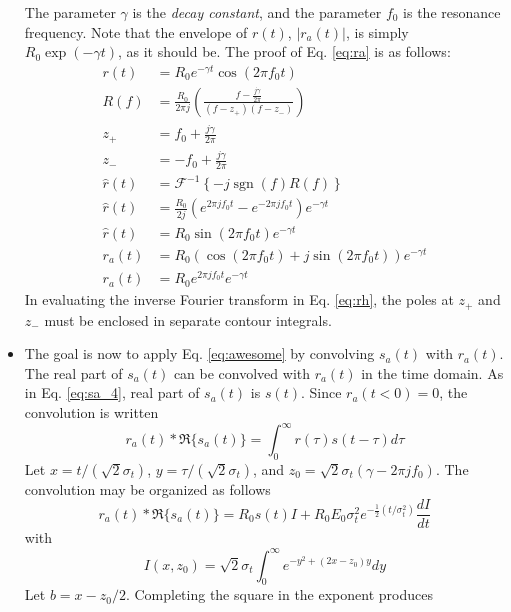 \documentclass[amsmath,amssymb,aps,prd,10pt,twocolumn,showkeys]{revtex4}
\DeclareMathOperator{\sgn}{sgn}
\begin{document}
\begin{itemize}
The parameter $\gamma$ is the \textit{decay constant}, and the parameter $f_0$ is the resonance frequency.  Note that the envelope of $r(t)$, $|r_a(t)|$, is simply $R_0 \exp(-\gamma t)$, as it should be.  The proof of Eq. \ref{eq:ra} is as follows:
\begin{align}
r(t) &= R_0 e^{-\gamma t} \cos(2\pi f_0 t) \\
R(f) &= \frac{R_0}{2\pi j} \left( \frac{f - \frac{j\gamma}{2\pi}}{(f-z_+)(f-z_-)} \right) \\
z_+ &= f_0 + \frac{j\gamma}{2\pi} \\
z_- &= -f_0 + \frac{j\gamma}{2\pi} \\
\widehat{r}(t) &= \mathcal{F}^{-1}\left \lbrace - j \sgn(f) R(f) \right \rbrace \label{eq:rh} \\ 
\widehat{r}(t) &= \frac{R_0}{2j}\left( e^{2\pi j f_0 t} - e^{-2\pi j f_0 t} \right) e^{-\gamma t} \\
\widehat{r}(t) &= R_0 \sin(2\pi f_0 t) e^{-\gamma t} \\
r_a (t) &= R_0 \left(\cos(2\pi f_0 t) + j\sin(2\pi f_0 t)\right) e^{-\gamma t} \\
r_a (t) &= R_0 e^{2\pi j f_0 t} e^{-\gamma t}
\end{align}
In evaluating the inverse Fourier transform in Eq. \ref{eq:rh}, the poles at $z_+$ and $z_-$ must be enclosed in separate contour integrals.
\item The goal is now to apply Eq. \ref{eq:awesome} by convolving $s_a(t)$ with $r_a(t)$.  The real part of $s_a(t)$ can be convolved with $r_a(t)$ in the time domain.  As in Eq. \ref{eq:sa_4}, real part of $s_a(t)$ is $s(t)$.  Since $r_a(t<0)=0$, the convolution is written
\begin{equation}
r_a(t) * \Re\lbrace s_a(t) \rbrace = \int_0^{\infty} r(\tau) s(t-\tau) d\tau
\end{equation}
Let $x=t/(\sqrt{2}\sigma_t)$, $y=\tau/(\sqrt{2}\sigma_t)$, and $z_0 = \sqrt{2}\sigma_t(\gamma-2\pi jf_0)$. The convolution may be organized as follows
\begin{equation}
r_a(t) * \Re\lbrace s_a(t) \rbrace = R_0 s(t) I + R_0 E_0 \sigma_t^2 e^{-\frac{1}{2}(t/\sigma_t^2)} \frac{dI}{dt} \label{eq:conv}
\end{equation}
with
\begin{equation}
I(x,z_0) = \sqrt{2}\sigma_t \int_0^{\infty} e^{-y^2 + (2x-z_0)y} dy
\end{equation}
Let $b = x-z_0/2$. Completing the square in the exponent produces
\begin{equation}

\end{equation}
\end{itemize}
\end{document}
